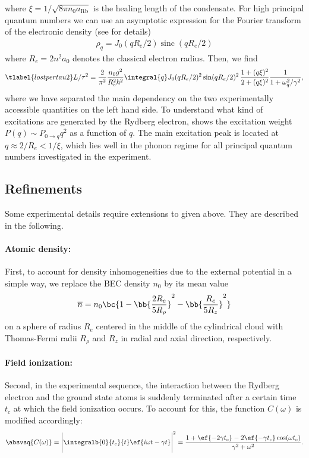 where $\xi=1/\sqrt{8\pi n_0 a_{\text{Rb}}}$ is the healing length of the condensate. For high principal quantum numbers we can use an asymptotic expression for the Fourier transform of the electronic density  (see  for details)
\begin{align}
    \rho_q=J_0(q R_e/2) \operatorname{sinc}(q R_e/2)
\end{align}
where $R_e=2n^2 a_0$ denotes the classical electron radius. Then, we find
\begin{align} \tlabel{lostpertau2}
L/\tau^2 = \frac{2}{\pi^2}\frac{n_0 g^2}{R_e^2 \hbar^2}\integral{q} J_0(q R_e/2)^2 \sin(q R_e/2)^2 \,\frac{1+(q\xi)^2}{2+(q\xi)^2} \frac{1}{1+\omega_q^2/\gamma^2},
\end{align}
where we have separated the main dependency on the two experimentally accessible quantities on the left hand side.
To understand what kind of excitations are generated by the Rydberg electron,  shows the excitation weight $P(q)\sim P_{0\rightarrow q} q^2$ as a function of $q$. The main excitation peak is located at $q\approx 2/R_e < 1/\xi$, which lies well in the phonon regime for all principal quantum numbers investigated in the experiment.


\subsection{Refinements}
Some experimental details require extensions to  given above. They are described in the following.

\paragraph{Atomic density:}
First, to account for density inhomogeneities due to the external potential in a simple way, we replace the BEC density $n_0$ by its mean value
\begin{align}
    \overline{n} = n_0 \bc{1-\bb{ \frac{2R_e}{5R_\rho} }^2 - \bb{ \frac{R_e}{5R_z} }^2}
\end{align}
on a sphere of radius $R_e$ centered in the middle of the cylindrical cloud with Thomas-Fermi radii $R_\rho$ and $R_z$ in radial and axial direction, respectively.

\paragraph{Field ionization:}
Second, in the experimental sequence, the interaction between the Rydberg electron and the ground state atoms is suddenly terminated after a certain time $t_c$ at which the field ionization occurs. To account for this, the function $C(\omega)$ is modified accordingly:
\begin{align}
\absvsq{C(\omega)}=\Bigg| \integralb{0}{t_c}{t}\ef{i\omega t-\gamma t} \Bigg|^2=\frac{1+\ef{-2\gamma t_c} -2 \ef{-\gamma t_c} \cos(\omega t_c)}{\gamma^2+\omega^2}.
\end{align}

